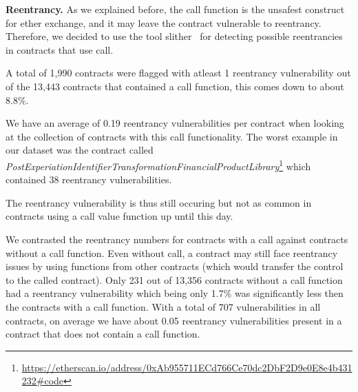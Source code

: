 \documentclass[10pt,conference]{IEEEtran}
\begin{document}
\textbf{Reentrancy.} As we explained before, the call function is the unsafest construct for ether exchange, and it may leave the contract vulnerable to reentrancy. Therefore, we decided to use the tool slither~\cite{slither} for detecting possible reentrancies in contracts that use call. 

A total of 1,990 contracts were flagged with atleast 1 reentrancy vulnerability out of the 13,443 contracts that contained a call function, this comes down to about 8.8\%. 

We have an average of 0.19 reentrancy vulnerabilities per contract when looking at the collection of contracts with this call functionality. 
The worst example in our dataset was the contract called
\textit{PostExperiationIdentifierTransformationFinancialProductLibrary}\footnote{\url{https://etherscan.io/address/0xAb955711ECd766Ce70dc2DbF2D9e0E8e4b431232\#code}} which contained 38 reentrancy vulnerabilities. 

The reentrancy vulnerability is thus still occuring but not as common in contracts using a call value function up until this day.

We contrasted the reentrancy numbers for contracts with a call against contracts without a call function. Even without call, a contract may still face reentrancy issues by using functions from other contracts (which would transfer the control to the called contract). Only 231 out of 13,356 contracts without a call function had a reentrancy vulnerability which being only 1.7\% was significantly less then the contracts with a call function. With a total of 707 vulnerabilities in all contracts, on average we have about 0.05 reentrancy vulnerabilities present in a contract that does not contain a call function. 


\end{document}
